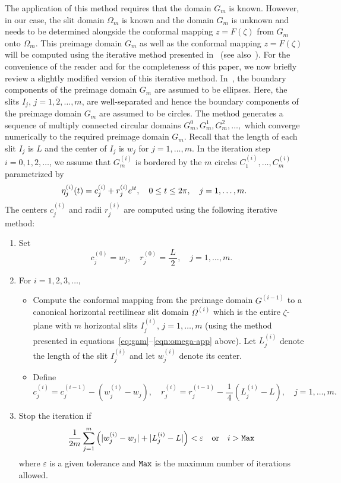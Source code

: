 The application of this method requires that the domain $G_m$ is known. However, in our case, the slit domain $\Omega_m$ is known and the domain $G_m$ is unknown and needs to be determined alongside the conformal mapping $z=F(\zeta)$ from $G_m$ onto $\Omega_m$. 
This preimage domain $G_m$ as well as the conformal mapping $z=F(\zeta)$ will be computed using the iterative method presented in~\cite{NG18} (see also~\cite{AST13}). 
For the convenience of the reader and for the completeness of this paper, we now briefly review a slightly modified version of this iterative method. 
In~\cite{NG18}, the boundary components of the preimage domain $G_m$ are assumed to be ellipses. Here, the slits $I_{j}$, $j=1,2,\ldots,m$, are well-separated and hence the boundary components of the preimage domain $G_m$ are assumed to be circles. The method generates a sequence of multiply connected circular domains $G_m^0,G_m^1,G_m^2,\ldots,$ which converge numerically to the required preimage domain $G_m$. 
Recall that the length of each slit $I_{j}$ is $L$ and the center of $I_{j}$ is $w_j$ for $j=1,\ldots,m$. 
In the iteration step $i=0,1,2,\ldots$, we assume that $G_m^{(i)}$ is bordered by the $m$ circles $C^{(i)}_1,\ldots,C^{(i)}_m$ parametrized by
\begin{equation}\label{eq:eta-i}
\eta^{(i)}_j(t)=c^{(i)}_j+r^{(i)}_je^{\mathrm{i} t}, \quad 0\le t\le 2\pi, \quad j=1,\ldots,m.
\end{equation}
The centers $c^{(i)}_j$ and radii $r^{(i)}_j$ are computed using the following iterative method:
\begin{enumerate}
	\item Set
	\[
	c^{(0)}_j=w_j, \quad r^{(0)}_j=\frac{\,L\,}{2}, \quad j=1,\ldots,m.
	\]
	\item For $i=1,2,3,\ldots,$
	\begin{itemize}
		\item Compute the conformal mapping from the preimage domain $G^{(i-1)}$ to a canonical horizontal rectilinear slit domain $\Omega^{(i)}$ which is the entire $\zeta$-plane with $m$ horizontal slits $I^{(i)}_{j}$, $j=1,\ldots,m$ (using the method presented in equations~\eqref{eq:gam}--\eqref{eqn:omega-app} above). Let $L^{(i)}_j$ denote the length of the slit $I^{(i)}_{j}$ and let $w^{(i)}_j$ denote its center.
		\item Define	
\[
c^{(i)}_j = c^{(i-1)}_j-(w^{(i)}_j-w_j), \quad 
r^{(i)}_j = r^{(i-1)}_j-\frac{\,1\,}{4}(L^{(i)}_j -L), \quad j=1,\ldots,m.
\]	
	
	
	\end{itemize}
	\item Stop the iteration if 
	\[
	\frac{1}{2m}\sum_{j=1}^{m}\left(|w^{(i)}_j - w_j|+|L^{(i)}_j -L|\right)<\varepsilon \quad{\rm or}\quad i>{\tt Max}
	\]
	where $\varepsilon$ is a given tolerance and ${\tt Max}$ is the maximum number of iterations allowed.		
\end{enumerate}

